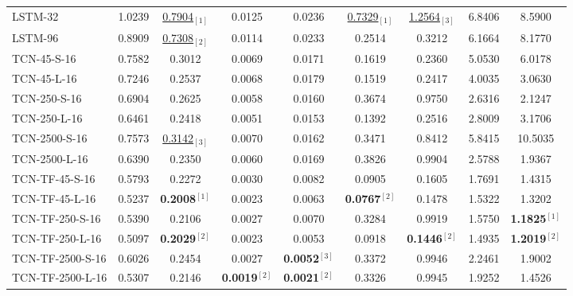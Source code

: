 \begin{table*}[h]
{\begin{tabular}{lcc|cc|cc|cc}
            \midrule
            LSTM-32 
                & 1.0239 & \underline{0.7904}$_{[1]}$
                & 0.0125 & 0.0236 & \underline{0.7329}$_{[1]}$ & \underline{1.2564}$_{[3]}$ & 6.8406 & 8.5900\\
            LSTM-96 
                & 0.8909 & \underline{0.7308}$_{[2]}$
                & 0.0114 & 0.0233 & 0.2514 & 0.3212 & 6.1664 & 8.1770\\
            \midrule
            TCN-45-S-16 
                & 0.7582 & 0.3012
                & 0.0069 & 0.0171 & 0.1619 & 0.2360 & 5.0530 & 6.0178\\
            TCN-45-L-16 
                & 0.7246 & 0.2537
                & 0.0068 & 0.0179 & 0.1519 & 0.2417 & 4.0035 & 3.0630\\
            TCN-250-S-16 
                & 0.6904 & 0.2625
                & 0.0058 & 0.0160 & 0.3674 & 0.9750 & 2.6316 & 2.1247\\
            TCN-250-L-16 
                & 0.6461 & 0.2418
                & 0.0051 & 0.0153 & 0.1392 & 0.2516 & 2.8009 & 3.1706\\
            TCN-2500-S-16 
                & 0.7573 & \underline{0.3142}$_{[3]}$
                & 0.0070 & 0.0162 & 0.3471 & 0.8412 & 5.8415 & 10.5035\\
            TCN-2500-L-16 
                & 0.6390 & 0.2350
                & 0.0060 & 0.0169 & 0.3826 & 0.9904 & 2.5788 & 1.9367\\
            \midrule
            TCN-TF-45-S-16 
                & 0.5793 & 0.2272
                & 0.0030 & 0.0082 & 0.0905 & 0.1605 & 1.7691 & 1.4315\\
            TCN-TF-45-L-16 
                & 0.5237 & \textbf{0.2008}$^{[1]}$
                & 0.0023 & 0.0063 & \textbf{0.0767}$^{[2]}$ & 0.1478 & 1.5322 & 1.3202\\
            TCN-TF-250-S-16 
                & 0.5390 & 0.2106
                & 0.0027 & 0.0070 & 0.3284 & 0.9919 & 1.5750 & \textbf{1.1825}$^{[1]}$\\
            TCN-TF-250-L-16 
                & 0.5097 & \textbf{0.2029}$^{[2]}$
                & 0.0023 & 0.0053 & 0.0918 & \textbf{0.1446}$^{[2]}$ & 1.4935 & \textbf{1.2019}$^{[2]}$\\
            TCN-TF-2500-S-16 
                & 0.6026 & 0.2454
                & 0.0027 & \textbf{0.0052}$^{[3]}$ & 0.3372 & 0.9946 & 2.2461 & 1.9002\\
            TCN-TF-2500-L-16 
                & 0.5307 & 0.2146
                & \textbf{0.0019}$^{[2]}$ & \textbf{0.0021}$^{[2]}$ & 0.3326 & 0.9945 & 1.9252 & 1.4526\\

\end{tabular}}
\end{table*}
